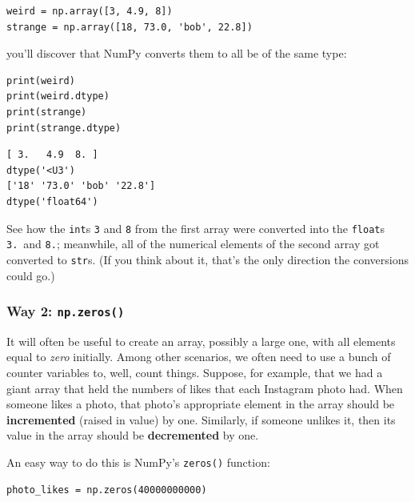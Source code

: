 \begin{Verbatim}[fontsize=\small,samepage=true,frame=single,framesep=3mm]
weird = np.array([3, 4.9, 8])
strange = np.array([18, 73.0, 'bob', 22.8])
\end{Verbatim}

you'll discover that NumPy converts them to all be of the same type:

\begin{Verbatim}[fontsize=\small,samepage=true,frame=single]
print(weird)
print(weird.dtype)
print(strange)
print(strange.dtype)
\end{Verbatim}

\begin{Verbatim}[fontsize=\small,samepage=true,frame=leftline,framesep=5mm,framerule=1mm]
[ 3.   4.9  8. ]
dtype('<U3')
['18' '73.0' 'bob' '22.8']
dtype('float64')
\end{Verbatim}

See how the \texttt{int}s \texttt{3} and \texttt{8} from the first array were
converted into the \texttt{float}s \texttt{3.}~and \texttt{8.}; meanwhile, all
of the numerical elements of the second array got converted to \texttt{str}s.
(If you think about it, that's the only direction the conversions could go.)

\subsubsection{Way 2: \texttt{np.zeros()}}


It will often be useful to create an array, possibly a large one, with all
elements equal to \textit{zero} initially. Among other scenarios, we often need
to use a bunch of counter variables to, well, count things. Suppose, for
example, that we had a giant array that held the numbers of likes that each
Instagram photo had. When someone likes a photo, that photo's appropriate
element in the array should be \textbf{incremented} (raised in value) by one.
Similarly, if someone unlikes it, then its value in the array should be
\textbf{decremented} by one.

An easy way to do this is NumPy's \texttt{zeros()} function:

\begin{Verbatim}[fontsize=\small,samepage=true,frame=single,framesep=3mm]
photo_likes = np.zeros(40000000000)
\end{Verbatim}

